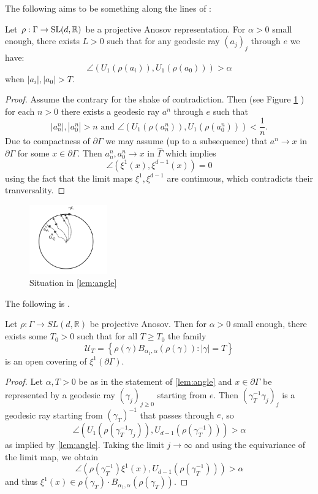 \documentclass{report}
\begin{document}
The following aims to be something along the lines of \cite*[Lemma 2.4]{pozzetti_anosov_2023}:
\begin{lemma}\label{lem:angle}
    Let $\rho: \Gamma \to \operatorname{{\mathrm{SL}}}(d, \mathbb R)$ be a projective Anosov representation.
    For $\alpha > 0$ small enough, there exists $L>0$ such that for any geodesic ray $(a_j)_j$ through $e$ we have:
    \[
        \angle(U_1(\rho(a_i)), U_1(\rho(a_0))) > \alpha
    \]
    when $|a_i|, |a_0| > T$.
\end{lemma}
\begin{proof}
Assume the contrary for the shake of contradiction.
Then (see Figure \ref{fig:angle} ) for each $n>0$ there exists a geodesic ray  $a^n$ through $e$ such that 
\[
    |a_n^n|, |a_0^n| > n \text{ and }
    \angle(U_1(\rho(a_n^n)), U_1(\rho(a_0^n))) < \frac{1}{n}.
\]
Due to compactness of $\partial \Gamma$ we may assume (up to a subsequence) that
$a^n \to x$ in $\partial \Gamma$ for some $x \in \partial \Gamma$.
Then 
$a^n_n, a_0^n \to x$ in $\hat \Gamma$ which implies
\[
    \angle (\xi^1(x), \xi^{d-1}(x)) = 0
\]
using the fact that the limit maps $\xi^1, \xi^{d-1}$ are continuous, which contradicts their tranversality.
\end{proof}
\begin{figure}[h]
    \centering
    \includegraphics[width=0.3\textwidth]{angle.jpg}
    \caption{Situation in \cref{lem:angle}}
    \label{fig:angle}
\end{figure}    

The following is \cite*[Proposition 3.5]{pozzetti_anosov_2023}.
\begin{lemma}\label{lem:boundary_covering}
Let $\rho: \Gamma \to SL(d, \mathbb R)$ be projective Anosov.
Then for $\alpha > 0$ small enough, there exists some $T_0 > 0$ such that for all $T \geq T_0$ the family
\[
    \mathcal U_T = \left\{ \rho(\gamma) B_{\alpha_1, \alpha}(\rho(\gamma)) : |\gamma| = T \right\}
\]
is an open covering of $\xi^1(\partial \Gamma)$.
\end{lemma}
\begin{proof}
    Let $\alpha, T > 0$ be as in the statement of \cref*{lem:angle} and $x \in \partial \Gamma$ be represented by a geodesic ray $(\gamma_j)_{j\geq 0}$ starting from $e$.
    Then $(\gamma_T^{-1} \gamma_j)_j$ is a geodesic ray starting from $(\gamma_T)^{-1}$ that passes through $e$, so
    \[
        \angle (U_1(\rho(\gamma_T^{-1}\gamma_j)), U_{d-1}(\rho(\gamma_T^{-1}))) > \alpha
    \]
    as implied by \cref*{lem:angle}.
    Taking the limit $j \to \infty$ and using the equivariance of the limit map, we obtain
    \[
        \angle (\rho(\gamma_T^{-1})\xi^1(x), U_{d-1}(\rho(\gamma_T^{-1}))) > \alpha
    \]
    and thus $\xi^1(x) \in \rho(\gamma_T) \cdot B_{\alpha_1, \alpha}(\rho(\gamma_T))$.
\end{proof}
\end{document}
